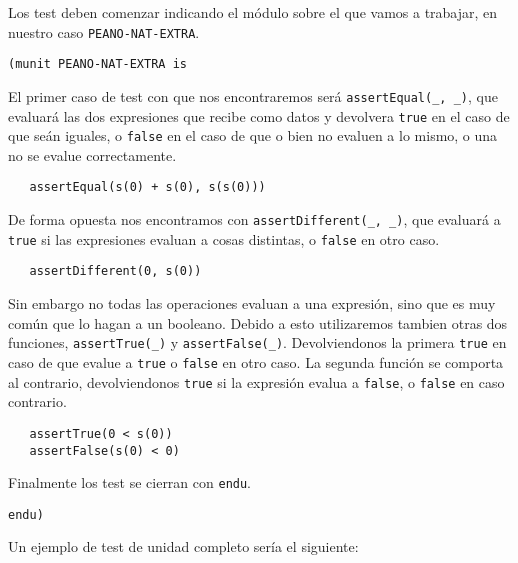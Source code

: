 Los test deben comenzar indicando el módulo sobre el que vamos a trabajar, en nuestro caso \texttt{PEANO-NAT-EXTRA}. \par

{\codesize
\begin{verbatim}
(munit PEANO-NAT-EXTRA is
\end{verbatim}
}

El primer caso de test con que nos encontraremos será \verb"assertEqual(_, _)", que evaluará las dos expresiones que recibe como datos y devolvera \texttt{true} en el caso de que seán iguales, o \texttt{false} en el caso de que o bien no evaluen a lo mismo, o una no se evalue correctamente. \par

{\codesize
\begin{verbatim}
   assertEqual(s(0) + s(0), s(s(0)))
\end{verbatim}
}

De forma opuesta nos encontramos con \verb"assertDifferent(_, _)", que evaluará a \texttt{true} si las expresiones evaluan a cosas distintas, o \texttt{false} en otro caso. \par

{\codesize
\begin{verbatim}
   assertDifferent(0, s(0))
\end{verbatim}
}

Sin embargo no todas las operaciones evaluan a una expresión, sino que es muy común que lo hagan a un booleano. Debido a esto utilizaremos tambien otras dos funciones, \verb"assertTrue(_)" y \verb"assertFalse(_)". Devolviendonos la primera \texttt{true} en caso de que evalue a \texttt{true} o \texttt{false} en otro caso. La segunda función se comporta al contrario, devolviendonos \texttt{true} si la expresión evalua a \texttt{false}, o \texttt{false} en caso contrario.\par

{\codesize
\begin{verbatim}
   assertTrue(0 < s(0))
   assertFalse(s(0) < 0)
\end{verbatim}
}

Finalmente los test se cierran con \texttt{endu}. \par

{\codesize
\begin{verbatim}
endu)
\end{verbatim}
}

Un ejemplo de test de unidad completo sería el siguiente: \par

